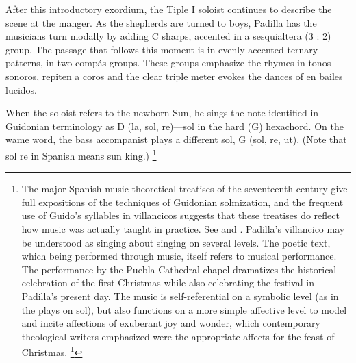 \documentclass{memoir}
\begin{document}
{{{{{      After this introductory exordium, the Tiple I soloist continues to describe the scene at the manger.
      As the shepherds are turned to boys, Padilla has the musicians turn modally by adding C sharps, accented in a sesquialtera (3 : 2) group.
      The passage that follows this moment is in evenly accented ternary patterns, in two-compás groups.
      These groups emphasize the rhymes in tonos sonoros, repiten a coros and the clear triple meter evokes the dances of en bailes lucidos.
    
      When the soloist refers to the newborn Sun, he sings the note identified in Guidonian terminology as D (la, sol, re)—sol in the hard (G) hexachord.
      On the wame word, the bass accompanist plays a different sol, G (sol, re, ut). (Note that sol re in Spanish means sun king.)
      \footnote{%
	The major Spanish music-theoretical treatises of the seventeenth century give full expositions of the techniques of Guidonian solmization, and the frequent use of Guido's syllables in villancicos suggests that these treatises do reflect how music was actually taught in practice.
	See  and .
      Padilla's villancico may be understood as singing about singing on several levels.
      The poetic text, which being performed through music, itself refers to musical performance.
      The performance by the Puebla Cathedral chapel dramatizes the historical celebration of the first Christmas while also celebrating the festival in Padilla’s present day.
      The music is self-referential on a symbolic level (as in the plays on sol), but also functions on a more simple affective level to model and incite affections of exuberant joy and wonder, which contemporary theological writers emphasized were the appropriate affects for the feast of Christmas.
      \footnote{%
	See the detailed discussion of such sources in chapter 3.
      A similar example of a villancico that includes multiple metamusical topics is Fuera, que va de invención (E-Bbc: M/760) by Joan Cererols (1618–1680), monk and chapelmaster at the Benedictine Abbey of Montserrat near Barcelona.
      \footnote{%
	Another villancico by Cererols is the subject of chapter 4.
      Like the numerous catalog-style Christmas songs in English, from Deck the Halls with Boughs of Holly to Chestnuts Roasting on an Open Fire, this villancico summons up all the elements of a Christmas festival—masques, zarabandas (sarabandes) and other dancing, lavish decorations and clothing, pipes, drums, and so on.
      As in many villancicos, the chorus acts dramatically in the role of the festival crowd, shouting affirmations (¡vaya!) for each element of the celebration as the soloists name them.
}}}}}}}}
\end{document}
